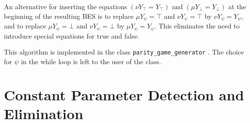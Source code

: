 \documentclass{article}
\begin{document}
An alternative for inserting the equations $(\nu Y_{\top }=Y_{\top })$ and $%
(\mu Y_{\bot }=Y_{\bot })$ at the beginning of the resulting BES is to
replace $\mu Y_{\psi }=\top $ and $\nu Y_{\psi }=\top $ by $\nu Y_{\psi
}=Y_{\psi }$, and to replace $\mu Y_{\psi }=\bot $ and $\nu Y_{\psi }=\bot $
by $\mu Y_{\psi }=Y_{\psi }$. This eliminates the need to introduce special
equations for true and false.

This algorithm is implemented in the class \texttt{{parity\_game\_generator}}%
. The choice for $\psi$ in the while loop is left to the user of the class.

\pagebreak

\section{Constant Parameter Detection and Elimination}
\end{document}
